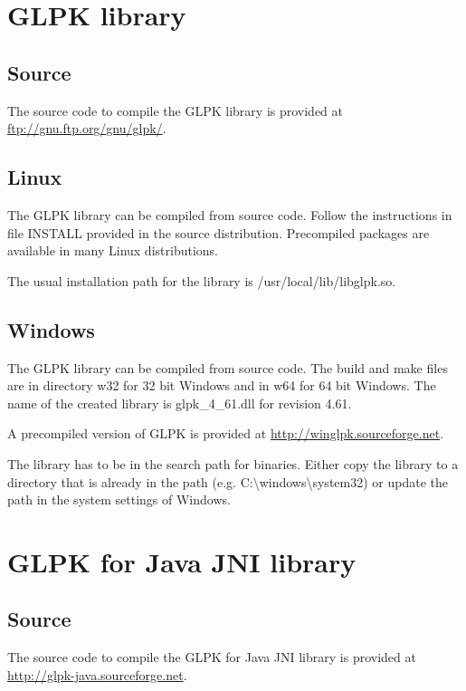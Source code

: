\documentclass[a4paper,11pt]{report}
\newcommand{\glpkVersionMajor}{4}
\newcommand{\glpkVersionMinor}{61}
\begin{document}
\section{GLPK library}

\subsection{Source}
The source code to compile the GLPK library is provided at \linebreak\href{ftp://gnu.ftp.org/gnu/glpk/}{ftp://gnu.ftp.org/gnu/glpk/}.

\subsection{Linux}
The GLPK library can be compiled from source code. Follow the instructions in file INSTALL provided in the source distribution. Precompiled packages are available in many Linux distributions.

The usual installation path for the library is /usr/local/lib/libglpk.so.
\subsection{Windows}
The GLPK library can be compiled from source code. The build and make files are in directory w32 for 32 bit Windows and in w64 for 64 bit Windows. The name of the created library is glpk\_\glpkVersionMajor\_\glpkVersionMinor.dll for revision \glpkVersionMajor.\glpkVersionMinor.

A precompiled version of GLPK is provided at \href{http://winglpk.sourceforge.net}{http://winglpk.sourceforge.net}.

The library has to be in the search path for binaries. Either copy the library to a directory that is already in the path (e.g. C:\textbackslash windows\textbackslash system32) or update the path in the system settings of Windows.

\section{GLPK for Java JNI library}
\subsection{Source}
The source code to compile the GLPK for Java JNI library is provided at \linebreak\href{http://glpk-java.sourceforge.net}{http://glpk-java.sourceforge.net}.
\end{document}
